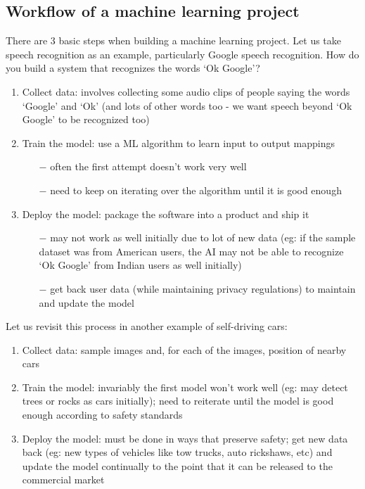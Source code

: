 \documentclass{article}[a4paper,12pt]
\theoremstyle{definition}
\begin{document}
\subsection{Workflow of a machine learning project}
There are 3 basic steps when building a machine learning project. Let us take speech recognition as an example, particularly Google speech recognition. How do you build a system that recognizes the words `Ok Google'?
\begin{enumerate}
	\item Collect data: involves collecting some audio clips of people saying the words `Google' and `Ok' (and lots of other words too - we want speech beyond `Ok Google' to be recognized too)
	\item Train the model: use a ML algorithm to learn input to output mappings
	\begin{itemize}
		\item[$-$] often the first attempt doesn't work very well
		\item[$-$] need to keep on iterating over the algorithm until it is good enough
	\end{itemize}
	\item Deploy the model: package the software into a product and ship it
	\begin{itemize}
		\item[$-$] may not work as well initially due to lot of new data (eg: if the sample dataset was from American users, the AI may not be able to recognize `Ok Google' from Indian users as well initially)
		\item[$-$] get back user data (while maintaining privacy regulations) to maintain and update the model
	\end{itemize}
\end{enumerate}
Let us revisit this process in another example of self-driving cars:
\begin{enumerate}
	\item Collect data: sample images and, for each of the images, position of nearby cars
	\item Train the model: invariably the first model won't work well (eg: may detect trees or rocks as cars initially); need to reiterate until the model is good enough according to safety standards
	\item Deploy the model: must be done in ways that preserve safety; get new data back (eg: new types of vehicles like tow trucks, auto rickshaws, etc) and update the model continually to the point that it can be released to the commercial market
\end{enumerate}
\end{document}
